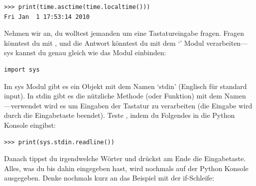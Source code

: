 \begin{Verbatim}[frame=single]
>>> print(time.asctime(time.localtime()))
Fri Jan  1 17:53:14 2010
\end{Verbatim}

Nehmen wir an, du wolltest jemanden um eine Tastatureingabe fragen. Fragen könntest du mit , und die Antwort könntest du mit dem `' Modul verarbeiten---sys kannst du genau gleich wie das  Modul einbinden:

\begin{Verbatim}[frame=single]
import sys
\end{Verbatim}

Im sys Modul gibt es ein Objekt mit dem Namen `stdin' (Englisch für standard input). In stdin gibt es die nützliche Methode (oder Funktion) mit dem Namen ---verwendet wird es um Eingaben der Tastatur zu verarbeiten (die Eingabe wird durch die Eingabetaste beendet). Teste , indem du Folgendes in die Python Konsole eingibst:

\begin{Verbatim}[frame=single]
>>> print(sys.stdin.readline())
\end{Verbatim}

Danach tippst du irgendwelche Wörter und drückst am Ende die Eingabetaste. Alles, was du bis dahin eingegeben hast, wird nochmals auf der Python Konsole ausgegeben. Denke nochmals kurz an das Beispiel mit der if-Schleife:

